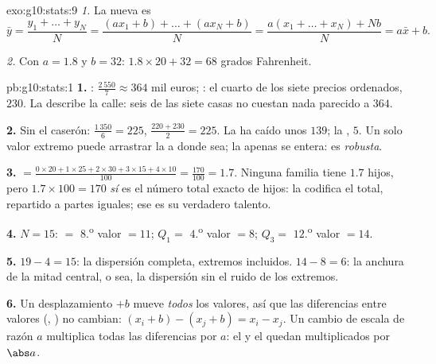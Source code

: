 \begin{solution}{exo:g10:stats:9}
\emph{1.} La nueva  es
\[
\bar y = \frac{y_1 + \dots + y_N}{N}
= \frac{(a x_1 + b) + \dots + (a x_N + b)}{N}
= \frac{a(x_1 + \dots + x_N) + Nb}{N}
= a \bar x + b .
\]

\emph{2.} Con $a = 1.8$ y $b = 32$:  $1.8 \times 20 + 32 = 68$ grados
Fahrenheit.
\end{solution}

\begin{solution}{pb:g10:stats:1}
\textbf{1.} : $\frac{2\,550}{7} \approx 364$ mil euros; : el
cuarto de los siete precios ordenados, $230$. La  describe la
calle: seis de las siete casas no cuestan nada parecido a $364$.

\textbf{2.} Sin el caserón:  $\frac{1\,350}{6} = 225$, 
$\frac{220 + 230}{2} = 225$. La  ha caído unos $139$; la ,
$5$. Un solo valor extremo puede arrastrar la  a donde sea; la
 apenas se entera: es \emph{robusta}.

\textbf{3.}  $= \frac{0 \times 20 + 1 \times 25 + 2 \times
30 + 3 \times 15 + 4 \times 10}{100} = \frac{170}{100} = 1.7$. Ninguna
familia tiene $1.7$ hijos, pero $1.7 \times 100 = 170$ \emph{sí} es el
número total exacto de hijos: la  codifica el total, repartido a
partes iguales; ese es su verdadero talento.

\textbf{4.} $N = 15$:  $=$ $8$.\textsuperscript{o} valor $= 11$;
$Q_1 =$ $4$.\textsuperscript{o} valor $= 8$; $Q_3 =$
$12$.\textsuperscript{o} valor $= 14$.

\textbf{5.}  $19 - 4 = 15$: la dispersión completa, extremos
incluidos.  $14 - 8 = 6$: la anchura de la mitad
central, o sea, la dispersión sin el ruido de los extremos.

\textbf{6.} Un desplazamiento $+b$ mueve \emph{todos} los valores, así que
las diferencias entre valores (, ) no
cambian: $(x_i + b) - (x_j + b) = x_i - x_j$. Un cambio de escala de razón
$a$ multiplica todas las diferencias por $a$: el  y el  quedan multiplicados por $\abs a$.


\end{solution}
